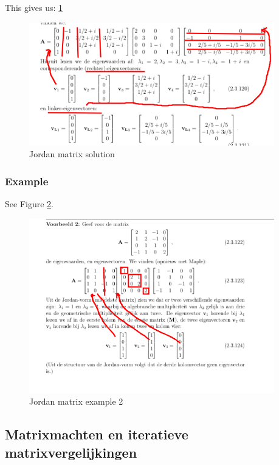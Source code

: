 \documentclass[a4paper]{report}
\begin{document}
This gives us: \ref{fig:jordan_sol}

\begin{figure}[htbp!]
	\begin{center}
		\includegraphics[width=0.95\textwidth]{./images/sol_jordan.png}
	\end{center}
	\caption{Jordan matrix solution}
	\label{fig:jordan_sol}
\end{figure}

\subsubsection{Example}

See Figure \ref{fig:jordan_ex_2}.
\begin{figure}[htbp!]
	\begin{center}
		\includegraphics[width=0.95\textwidth]{./images/jordan_ex_2.png}
	\end{center}
	\caption{Jordan matrix example 2}
	\label{fig:jordan_ex_2}
\end{figure}

\subsection{Matrixmachten en iteratieve matrixvergelijkingen}
\end{document}
